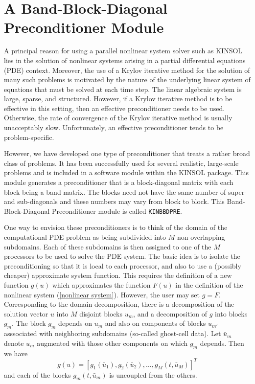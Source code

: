 \documentclass[11pt]{article}
\begin{document}
\section{A Band-Block-Diagonal Preconditioner Module}

A principal reason for using a parallel nonlinear system solver such as 
KINSOL lies in the solution of nonlinear systems arising in a partial 
differential equations (PDE) context.  Moreover,
the use of a Krylov iterative method for the solution of many such
problems is motivated by the nature of the underlying linear system of
equations that must be solved at each time step.  The
linear algebraic system is large, sparse, and structured. However, if
a Krylov iterative method is to be effective in this setting, then an
effective preconditioner needs to be used.  Otherwise, the rate of
convergence of the Krylov iterative method is usually unacceptably
slow.  Unfortunately, an effective preconditioner tends to be
problem-specific.

However, we have developed one type of preconditioner that treats a
rather broad class of problems.  It has been successfully
used for several realistic, large-scale problems and is
included in a software module within the KINSOL package. This module
generates a preconditioner that is a block-diagonal matrix with each
block being a band matrix. The blocks need not have the same number of
super- and sub-diagonals and these numbers may vary from block to
block. This Band-Block-Diagonal Preconditioner module is called
{\tt KINBBDPRE}.

One way to envision these preconditioners is to think of the domain of
the computational PDE problem as being subdivided into $M$ non-overlapping
subdomains.  Each of these subdomains is then assigned to one of the
$M$ processors to be used to solve the PDE system. The basic idea is
to isolate the preconditioning so that it is local to each processor,
and also to use a (possibly cheaper) approximate system
function. This requires the definition of a new function $g(u)$
which approximates the function $F(u)$ in the definition of the nonlinear
system (\ref{nonlinear system}). However, the user may set $g = F$.  
Corresponding to the domain decomposition, there is a decomposition of the 
solution vector $u$ into $M$ disjoint blocks $u_m$, and a decomposition of $g$
into blocks $g_m$.  The block $g_m$ depends on $u_m$ and also on
components of blocks $u_{m'}$ asssociated with neighboring subdomains
(so-called ghost-cell data).  Let $\bar{u}_m$ denote $u_m$ augmented
with those other components on which $g_m$ depends.  Then we have
\begin{equation}
g(u) = [g_1(\bar{u}_1), g_2(\bar{u}_2), \ldots, g_M(t,\bar{u}_M)]^T
\end{equation}
and each of the blocks $g_m(t, \bar{u}_m)$ is uncoupled from the others.
\end{document}

